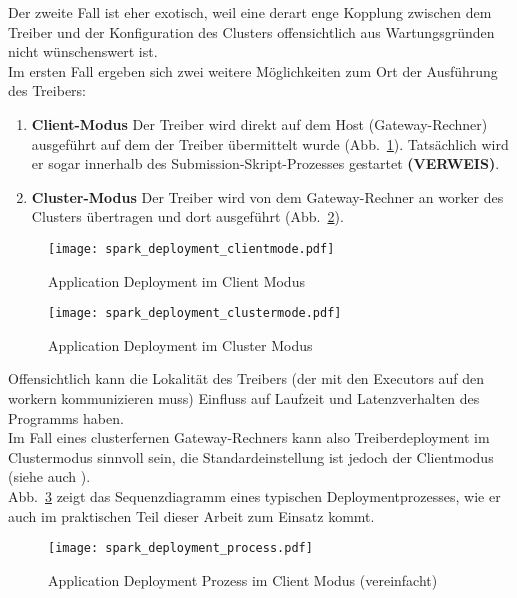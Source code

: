 Der zweite Fall ist eher exotisch, weil eine derart enge Kopplung zwischen dem Treiber und der Konfiguration des Clusters offensichtlich aus Wartungsgründen nicht wünschenswert ist.\\

Im ersten Fall ergeben sich zwei weitere Möglichkeiten zum Ort der Ausführung des Treibers:\\

\begin{enumerate}
	\item \textbf{Client-Modus}	Der Treiber wird direkt auf dem Host (Gateway-Rechner) ausgeführt auf dem der Treiber übermittelt wurde (Abb.~\ref{fig:spark_deployment_clientmode}). Tatsächlich wird er sogar innerhalb des Submission-Skript-Prozesses gestartet \textbf{(VERWEIS)}.
	\item \textbf{Cluster-Modus}	Der Treiber wird von dem Gateway-Rechner an \gls{worker} des Clusters übertragen und dort ausgeführt (Abb.~\ref{fig:spark_deployment_clustermode}).
\end{enumerate}

\begin{figure}[ht!]
	\centering
  \texttt{[image: spark\_deployment\_clientmode.pdf]}
	\caption{Application Deployment im Client Modus}
	\label{fig:spark_deployment_clientmode}
\end{figure}

\begin{figure}[ht!]
	\centering
  \texttt{[image: spark\_deployment\_clustermode.pdf]}
	\caption{Application Deployment im Cluster Modus}
	\label{fig:spark_deployment_clustermode}
\end{figure}

Offensichtlich kann die Lokalität des Treibers (der mit den Executors auf den \gls{worker}n kommunizieren muss) Einfluss auf Laufzeit und Latenzverhalten des Programms haben.\\

Im Fall eines clusterfernen Gateway-Rechners kann also Treiberdeployment im Clustermodus sinnvoll sein, die Standardeinstellung ist jedoch der Clientmodus (siehe auch \cite{spark_submission}).\\

Abb.~\ref{fig:app_deployment_process} zeigt das Sequenzdiagramm eines typischen Deploymentprozesses, wie er auch im praktischen Teil dieser Arbeit zum Einsatz kommt.

\begin{figure}[ht!]
	\centering
  \texttt{[image: spark\_deployment\_process.pdf]}
	\caption{Application Deployment Prozess im Client Modus (vereinfacht)}
	\label{fig:app_deployment_process}
\end{figure}

